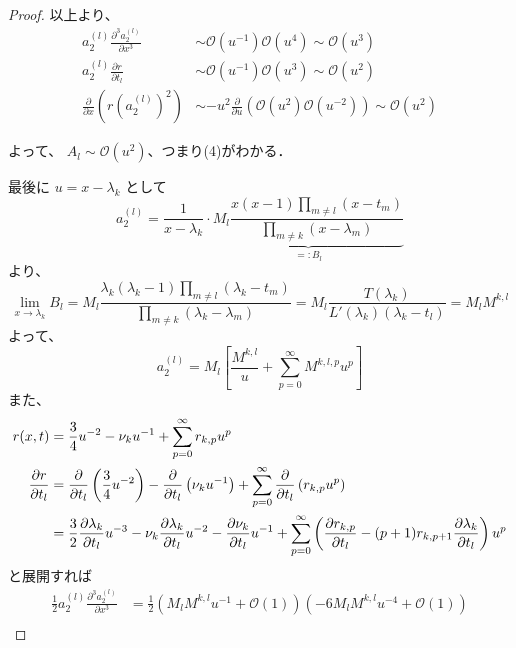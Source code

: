 \documentclass[paper=a4, fontsize=11pt]{jlreq} %
\newenvironment{story}{%
  \begin{mdframed}[
    backgroundcolor=red!5, %
    linewidth=0pt,         %
    innertopmargin=10pt,   %
    innerbottommargin=10pt,
    innerrightmargin=10pt, %
    innerleftmargin=10pt
  ]%
}{%
  \end{mdframed}%
}
\theoremstyle{break}
\theoremstyle{qa}
\begin{document}
\begin{story}
\begin{proof}
以上より、
\begin{align*}
a_2^{(l)} \frac{\partial^3 a_2^{(l)}}{\partial x^3} &\sim \mathcal{O}(u^{-1}) \mathcal{O}(u^4) \sim \mathcal{O}(u^3) \\
a_2^{(l)} \frac{\partial r}{\partial t_l} &\sim \mathcal{O}(u^{-1}) \mathcal{O}(u^3) \sim \mathcal{O}(u^2) \\
\frac{\partial}{\partial x} \left( r (a_2^{(l)})^2 \right) &\sim -u^2 \frac{\partial}{\partial u} \left( \mathcal{O}(u^2) \mathcal{O}(u^{-2}) \right) \sim \mathcal{O}(u^2)
\end{align*}

よって、 $A_l \sim \mathcal{O}(u^2)$、つまり(4)がわかる．

最後に $u=x-\lambda_k$ として
\begin{equation*}
    a_2^{(l)} = \frac{1}{x-\lambda_k} \cdot \underbrace{M_l \frac{x(x-1) \prod_{m \neq l} (x-t_m)}{\prod_{m \neq k} (x-\lambda_m)}}_{=: B_l}
\end{equation*}
より、
\begin{equation*}
    \lim_{x \to \lambda_k} B_l = M_l \frac{\lambda_k(\lambda_k-1) \prod_{m \neq l} (\lambda_k-t_m)}{\prod_{m \neq k} (\lambda_k-\lambda_m)} = M_l \frac{T(\lambda_k)}{L'(\lambda_k)(\lambda_k-t_l)} = M_l M^{k,l}
\end{equation*}
よって、
\begin{equation*}
    a_2^{(l)} = M_l \left[ \frac{M^{k,l}}{u} + \sum_{p=0}^\infty M^{k,l,p} u^p \right]
\end{equation*}
また、
\begin{align*}
    r(x,t) &= \frac{3}{4} u^{-2} - \nu_k u^{-1} + \sum_{p=0}^\infty r_{k,p} u^p \\
    \frac{\partial r}{\partial t_l} &= \frac{\partial}{\partial t_l} \left( \frac{3}{4} u^{-2} \right) - \frac{\partial}{\partial t_l} \left( \nu_k u^{-1} \right) + \sum_{p=0}^\infty \frac{\partial}{\partial t_l} \left( r_{k,p} u^p \right) \notag \\
    &= \frac{3}{2} \frac{\partial \lambda_k}{\partial t_l} u^{-3} - \nu_k \frac{\partial \lambda_k}{\partial t_l} u^{-2} - \frac{\partial \nu_k}{\partial t_l} u^{-1} + \sum_{p=0}^\infty \left( \frac{\partial r_{k,p}}{\partial t_l} - (p+1) r_{k,p+1} \frac{\partial \lambda_k}{\partial t_l} \right) u^p
\end{align*}
と展開すれば
\begin{align*}
    \frac{1}{2} a_2^{(l)} \frac{\partial^3 a_2^{(l)}}{\partial x^3} &= \frac{1}{2} \left( M_l M^{k,l} u^{-1} + \mathcal{O}(1) \right) \left( -6 M_l M^{k,l} u^{-4} + \mathcal{O}(1) \right) \\

\end{align*}
\end{proof}
\end{story}
\end{document}
